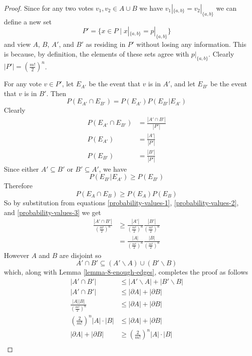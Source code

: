 	\begin{proof}
		Since for any two votes $v_1, v_2 \in A \cup B$ we have $v_1|_{\{a,b\}} = v_2|_{\{a,b\}}$ we can define a new set
		\[
			P' = \{x \in P \mid x|_{\{a,b\}} = p|_{\{a,b\}}\}
		\]
		and view $A$, $B$, $A'$, and $B'$ as residing in $P'$ without losing any information. This is because, by definition, the elements of these sets agree with $p|_{\{a,b\}}$. Clearly $|P'| = (\frac{m!}{2})^n$.

		For any vote $v \in P'$, let $E_{A'}$ be the event that $v$ is in $A'$, and let $E_{B'}$ be the event that $v$ is in $B'$. Then
		\[
			P(E_{A'} \cap E_{B'}) = P(E_{A'}) P(E_{B'}|E_{A'})
		\]
		Clearly
		\begin{align}
			\label{probability-values-1}
			P(E_{A'} \cap E_{B'}) &= \frac{|A' \cap B'|}{|P'|} \\
			\label{probability-values-2}
			P(E_{A'}) &= \frac{|A'|}{|P'|} \\
			\label{probability-values-3}
			P(E_{B'}) &= \frac{|B'|}{|P'|}
		\end{align}
		Since either $A' \subseteq B'$ or $B' \subseteq A'$, we have
		\[
			P(E_{B'}|E_{A'}) \ge P(E_{B'})
		\]
		Therefore
		\[
			P(E_A \cap E_B) \ge P(E_A) P(E_B)
		\]
		So by substitution from equations \ref{probability-values-1}, \ref{probability-values-2}, and \ref{probability-values-3} we get
		\begin{align*}
			\frac{|A' \cap B'|}{(\frac{m!}{2})^n} &\ge \frac{|A'|}{(\frac{m!}{2})^n} \frac{|B'|}{(\frac{m!}{2})^n} \\
			&= \frac{|A|}{(\frac{m!}{2})^n} \frac{|B|}{(\frac{m!}{2})^n}
		\end{align*}
		However $A$ and $B$ are disjoint so
		\[
			A' \cap B' \subseteq (A' \backslash A) \cup (B' \backslash B)
		\]
		which, along with Lemma \ref{lemma-8-enough-edges}, completes the proof as follows
		\begin{align*}
			|A' \cap B'| &\le |A' \backslash A| + |B' \backslash B| \\
			|A' \cap B'| &\le |\partial A| + |\partial B| \\
			\frac{|A||B|}{(\frac{m!}{2})^n} &\le |\partial A| + |\partial B| \\
			\left(\frac{2}{m!}\right)^n |A| \cdot |B| &\le |\partial A| + |\partial B| \\
			|\partial A| + |\partial B| &\ge \left(\frac{2}{m!}\right)^n |A| \cdot |B| \\
		\end{align*}
	\end{proof}

